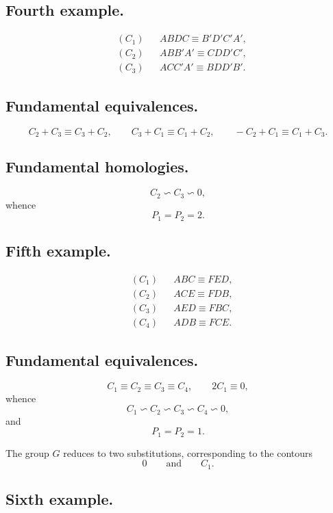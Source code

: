 \documentclass{article}
\begin{document}
\subsection*{Fourth example.}

\[ \begin{aligned} &(C_{1}) &&ABDC \equiv B'D'C'A',\\ &(C_{2}) &&ABB'A' \equiv CDD'C',\\ &(C_{3}) &&ACC'A' \equiv BDD'B'. \end{aligned} \]

\subsection*{Fundamental equivalences.}

\[ C_{2} + C_{3} \equiv C_{3} + C_{2}, \qquad C_{3} + C_{1} \equiv C_{1} + C_{2}, \qquad -C_{2} + C_{1} \equiv C_{1} + C_{3}. \]

\subsection*{Fundamental homologies.}

\[ C_{2} \backsim C_{3} \backsim 0, \]
whence
\[ P_{1} = P_{2} = 2. \]
\subsection*{Fifth example.}

\[ \begin{aligned} &(C_{1}) &&ABC \equiv FED,\\ &(C_{2}) &&ACE \equiv FDB,\\ &(C_{3}) &&AED \equiv FBC,\\ &(C_{4}) &&ADB \equiv FCE. \end{aligned} \]

\subsection*{Fundamental equivalences.}

\[ C_{1} \equiv C_{2} \equiv C_{3} \equiv C_{4}, \qquad 2C_{1} \equiv 0, \]
whence
\[ C_{1} \backsim C_{2} \backsim C_{3} \backsim C_{4} \backsim 0, \]
and
\[ P_{1} = P_{2} = 1. \]

The group $G$ reduces to two substitutions, corresponding to the contours
\[ 0 \qquad \text{and} \qquad C_{1}. \]

\subsection*{Sixth example.}
\end{document}
